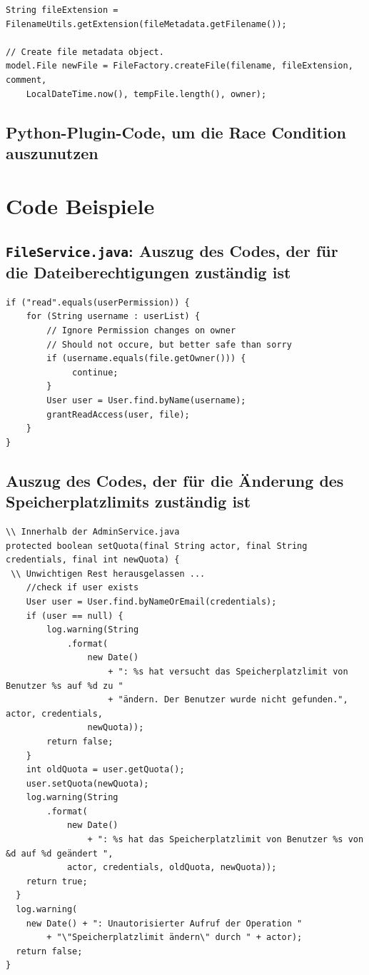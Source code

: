 \documentclass[12pt,DIV14,BCOR10mm,a4paper,parskip=half-,headsepline,headinclude,english,ngerman,bibliography=totocnumbered]{scrreprt}
\begin{document}
\begin{appendices}
\begin{lstlisting}
String fileExtension = FilenameUtils.getExtension(fileMetadata.getFilename());

// Create file metadata object.
model.File newFile = FileFactory.createFile(filename, fileExtension, comment,
    LocalDateTime.now(), tempFile.length(), owner);
\end{lstlisting}

\section{Python-Plugin-Code, um die Race Condition auszunutzen}
\label{fileraceplugin}




\chapter{Code Beispiele}

\section{\texttt{FileService.java}: Auszug des Codes, der für die Dateiberechtigungen zuständig ist}
\label{filepermissions}
\begin{lstlisting}
if ("read".equals(userPermission)) {
	for (String username : userList) {
		// Ignore Permission changes on owner
		// Should not occure, but better safe than sorry
		if (username.equals(file.getOwner())) {
		     continue;
		}
		User user = User.find.byName(username);
		grantReadAccess(user, file);
	}
}
\end{lstlisting}

\section{Auszug des Codes, der für die Änderung des Speicherplatzlimits zuständig ist}
\label{quota-change-fail}
\begin{lstlisting}
\\ Innerhalb der AdminService.java
protected boolean setQuota(final String actor, final String credentials, final int newQuota) {
 \\ Unwichtigen Rest herausgelassen ...
    //check if user exists
    User user = User.find.byNameOrEmail(credentials);
    if (user == null) {
        log.warning(String
            .format(
                new Date()
                    + ": %s hat versucht das Speicherplatzlimit von Benutzer %s auf %d zu "
                    + "ändern. Der Benutzer wurde nicht gefunden.", actor, credentials,
                newQuota));
        return false;
    }
    int oldQuota = user.getQuota();
    user.setQuota(newQuota);
    log.warning(String
        .format(
            new Date()
                + ": %s hat das Speicherplatzlimit von Benutzer %s von &d auf %d geändert ",
            actor, credentials, oldQuota, newQuota));
    return true;
  }
  log.warning(
    new Date() + ": Unautorisierter Aufruf der Operation "
        + "\"Speicherplatzlimit ändern\" durch " + actor);
  return false;
}


\end{lstlisting}
\end{appendices}
\end{document}
